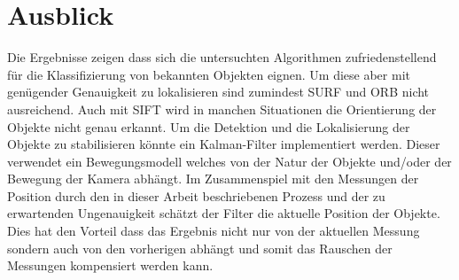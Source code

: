 \chapter{Ausblick}

Die Ergebnisse zeigen dass sich die untersuchten Algorithmen zufriedenstellend für die Klassifizierung von bekannten Objekten eignen.
Um diese aber mit genügender Genauigkeit zu lokalisieren sind zumindest SURF und ORB nicht ausreichend.
Auch mit SIFT wird in manchen Situationen die Orientierung der Objekte nicht genau erkannt.
Um die Detektion und die Lokalisierung der Objekte zu stabilisieren könnte ein Kalman-Filter implementiert werden.
Dieser verwendet ein Bewegungsmodell welches von der Natur der Objekte und/oder der Bewegung der Kamera abhängt.
Im Zusammenspiel mit den Messungen der Position durch den in dieser Arbeit beschriebenen Prozess und der zu erwartenden Ungenauigkeit schätzt der Filter die aktuelle Position der Objekte.
Dies hat den Vorteil dass das Ergebnis nicht nur von der aktuellen Messung sondern auch von den vorherigen abhängt und somit das Rauschen der Messungen kompensiert werden kann.

